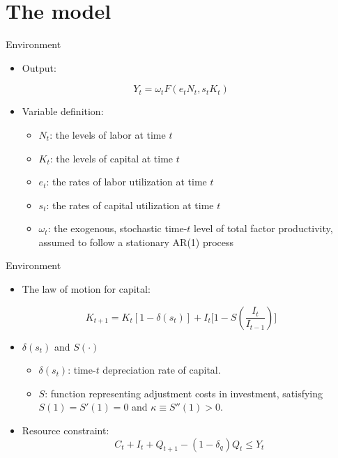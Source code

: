 \documentclass[fontset=windows,12pt,t,aspectratio=169]{beamer}
\begin{document}
\section{The model}
\begin{frame}{Environment}
    \begin{itemize}
       \item Output:
    \end{itemize}
    \[ Y_t = \omega_t F(e_t N_t, s_t K_t) \]
    \begin{itemize}
    \item Variable definition:
        \begin{itemize}
           \item $N_t$: the levels of labor at time $t$
           \item $K_t$: the levels of capital at time $t$
           \item $e_t$: the rates of labor utilization at time $t$
           \item $s_t$: the rates of capital utilization at time $t$
           \item $\omega_t$: the exogenous, stochastic time-$t$ level of total factor productivity, assumed to follow a stationary AR(1) process
        \end{itemize}
    \end{itemize}
\end{frame}

\begin{frame}{Environment}
    \begin{itemize}
       \item The law of motion for capital:
    \end{itemize}
    \[ K_{t+1} = K_t[1 - \delta (s_t)] + I_t\big[1 - S(\frac{I_t}{I_{t-1}})\big] \tag{1} \]
    \begin{itemize}
      \item $\delta(s_t)$ and $S(\cdot)$
        \begin{itemize}
            \item \( \delta(s_t) \): time-\(t\) depreciation rate of capital.
            \item \( S \): function representing adjustment costs in investment, satisfying \( S(1) = S'(1) = 0 \) and \( \kappa \equiv S''(1) > 0 \).
         \end{itemize}
         \item Resource constraint:
        \[ C_t + I_t + Q_{t+1} - (1 - \delta_q) Q_t \leq Y_t \tag{2} \]
    \end{itemize}
\end{frame}
\end{document}
